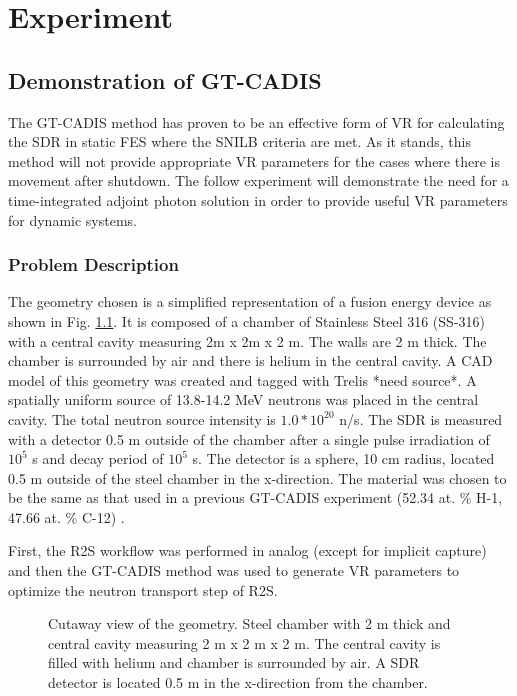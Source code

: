 \chapter{Experiment} \label{ch:exp}

\section{Demonstration of GT-CADIS} \label{sec:gtcadis}
The GT-CADIS method has proven to be an effective form of VR for calculating the
SDR in static FES where the SNILB criteria are met.  As it stands, this method
will not provide appropriate VR parameters for the cases where there is movement
after shutdown.  The follow experiment will demonstrate the need for a
time-integrated adjoint photon solution in order to provide useful VR parameters for
dynamic systems.

\subsection{Problem Description} \label{sec:description}
The geometry chosen is a simplified representation of a fusion energy device as
shown in Fig. \ref{fig:geom}.
It is composed of a chamber of Stainless Steel 316 (SS-316) with a central cavity measuring
2m x 2m x 2 m.  The walls are 2 m thick.  The chamber is surrounded by air and
there is helium in the central cavity.  A CAD model of this geometry was created and tagged
with Trelis *need source*.  A spatially uniform source of
13.8-14.2 MeV neutrons was placed in the central cavity. The total neutron
source intensity is $1.0*10^{20}$ n/s.
The SDR is measured with a detector
0.5 m outside of the chamber after a single pulse irradiation of $10^5$ s and
decay period of $10^5$ s.  The detector is a sphere, 10 cm radius, located 0.5
m outside of the steel chamber in the x-direction. The material was chosen to
be the same as that used in a previous GT-CADIS experiment (52.34 at. \% H-1,
47.66 at. \% C-12) \cite{gtcadis}.  

First, the R2S workflow was performed in analog (except for implicit capture) 
and then the GT-CADIS method was used to generate VR parameters
to optimize the neutron transport step of R2S.

\begin{figure}\label{fig:geom}
	\caption[Experimental Geometry] 
	{Cutaway view of the geometry.  Steel
	chamber with 2 m thick and central cavity measuring 2 m x 2 m x 2 m.
	The central cavity is filled with helium and chamber is surrounded by air.
	A SDR detector is located 0.5 m in the x-direction from the chamber.}
\end{figure}

